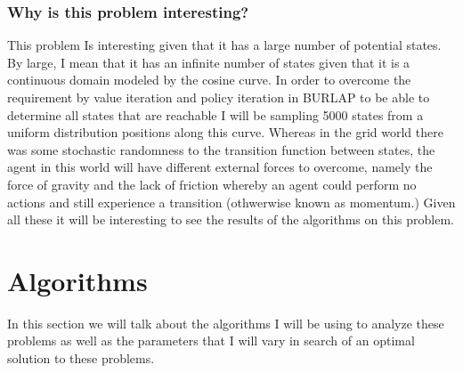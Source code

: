 \documentclass[11pt]{article}
\begin{document}
    \subsubsection{Why is this problem interesting?}
    This problem Is interesting given that it has a large number of potential states.
    By large, I mean that it has an infinite number of states given that it is a continuous domain modeled by the cosine curve.
    In order to overcome the requirement by value iteration and policy iteration in BURLAP to be able to determine all
    states that are reachable I will be sampling 5000 states from a uniform distribution positions along this curve.
    Whereas in the grid world there was some stochastic randomness to the transition function between states, the agent
    in this world will have different external forces to overcome, namely the force of gravity and the lack of friction
    whereby an agent could perform no actions and still experience a transition (othwerwise known as momentum.)
    Given all these it will be interesting to see the results of the algorithms on this problem.


    \section{Algorithms}
    In this section we will talk about the algorithms I will be using to analyze these problems as well as the parameters
    that I will vary in search of an optimal solution to these problems.
\end{document}
